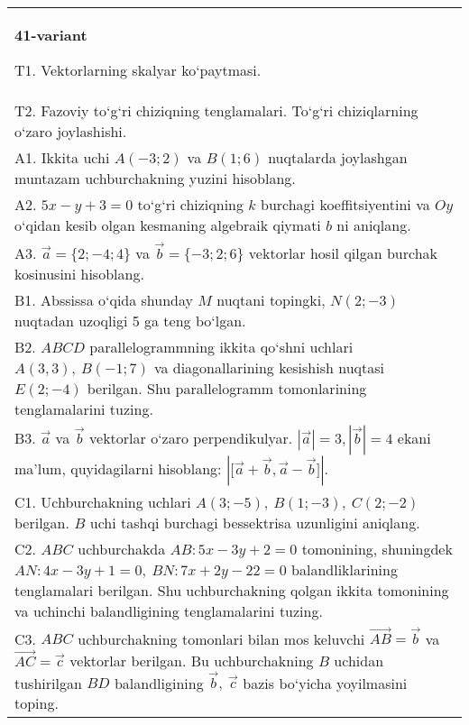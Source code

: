 \documentclass{article}
\begin{document}
\begin{tabular}{m{17cm}}
\textbf{41-variant}
\newline

T1. 
Vektorlarning skalyar ko‘paytmasi.
 \\
T2. 
Fazoviy to‘g‘ri chiziqning tenglamalari. To‘g‘ri chiziqlarning o‘zaro joylashishi.
 \\
A1. 
Ikkita uchi $A (-3; 2) $ va $B (1; 6) $ nuqtalarda
joylashgan muntazam uchburchakning yuzini hisoblang.
 \\
A2. 
$5x-y+3=0$ to‘g‘ri chiziqning $k$ burchagi
koeffitsiyentini va $Oy$ o‘qidan kesib olgan kesmaning algebraik
qiymati $b$ ni aniqlang.
 \\
A3. 
$\overrightarrow{a} = \{ 2; - 4;4\}$ va $\overrightarrow{b} = \{ - 3;2;6\}$
vektorlar hosil qilgan burchak kosinusini hisoblang.
 \\
B1. 
Abssissa o‘qida shunday $M$ nuqtani topingki,
\(N (2;-3) \) nuqtadan uzoqligi 5 ga teng bo‘lgan.
 \\
B2. 
$ABCD$ parallelogrammning ikkita qo‘shni uchlari
\(A (3,3),\ B (-1;7) \) va diagonallarining kesishish nuqtasi
\(E (2;-4) \) berilgan. Shu parallelogramm tomonlarining tenglamalarini
tuzing.
 \\
B3. 
$\vec{a}$ va $\vec{b}$ vektorlar o‘zaro perpendikulyar. $|\vec{a}| = 3,|\vec{b}| = 4$ ekani ma’lum, quyidagilarni hisoblang:
$|\lbrack\vec{a} + \vec{b},\vec{a} - \vec{b}\rbrack|$.
 \\
C1. 
Uchburchakning uchlari
\(A (3; - 5),\ B (1; - 3),\ C (2; - 2) \) berilgan. $B$ uchi tashqi
burchagi bessektrisa uzunligini aniqlang.
 \\
C2. 
$ABC$ uchburchakda \(AB:5x-3y+2=0\)
tomonining, shuningdek \(AN:4x - 3y + 1 = 0,\ BN:7x + 2y - 22 = 0\)
balandliklarining tenglamalari berilgan. Shu uchburchakning qolgan ikkita
tomonining va uchinchi balandligining tenglamalarini tuzing.
 \\
C3. 
\(ABC\) uchburchakning tomonlari bilan mos keluvchi \(\vec{AB} = \vec{b}\) va \(\vec{AC} = \vec{c}\) vektorlar berilgan. Bu uchburchakning \(B\) uchidan tushirilgan \(BD\) balandligining \(\vec{b},\ \vec{c}\) bazis bo‘yicha yoyilmasini toping.
 \\

\end{tabular}
\vspace{1cm}
\end{document}
